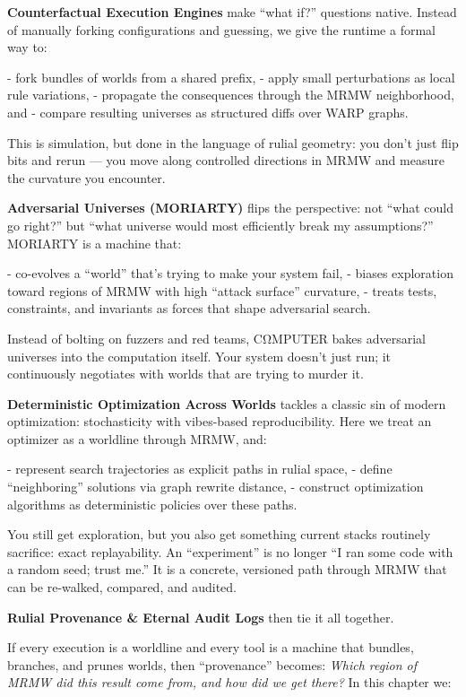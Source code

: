 \textbf{Counterfactual Execution Engines} make “what if?” questions native. Instead of manually forking configurations and guessing, we give the runtime a formal way to:

- fork bundles of worlds from a shared prefix,
- apply small perturbations as local rule variations,
- propagate the consequences through the MRMW neighborhood, and
- compare resulting universes as structured diffs over WARP graphs.

This is simulation, but done in the language of rulial geometry: you don’t just flip bits and rerun — you move along controlled directions in MRMW and measure the curvature you encounter.

\textbf{Adversarial Universes (MORIARTY)} flips the perspective: not “what could go right?” but “what universe would most efficiently break my assumptions?” MORIARTY is a machine that:

- co-evolves a “world” that’s trying to make your system fail,
- biases exploration toward regions of MRMW with high “attack surface” curvature,
- treats tests, constraints, and invariants as forces that shape adversarial search.

Instead of bolting on fuzzers and red teams, CΩMPUTER bakes adversarial universes into the computation itself. Your system doesn’t just run; it continuously negotiates with worlds that are trying to murder it.

\textbf{Deterministic Optimization Across Worlds} tackles a classic sin of modern optimization: stochasticity with vibes-based reproducibility. Here we treat an optimizer as a worldline through MRMW, and:

- represent search trajectories as explicit paths in rulial space,
- define “neighboring” solutions via graph rewrite distance,
- construct optimization algorithms as deterministic policies over these paths.

You still get exploration, but you also get something current stacks routinely sacrifice: exact replayability. An “experiment” is no longer “I ran some code with a random seed; trust me.” It is a concrete, versioned path through MRMW that can be re-walked, compared, and audited.

\textbf{Rulial Provenance \& Eternal Audit Logs} then tie it all together.

If every execution is a worldline and every tool is a machine that bundles, branches, and prunes worlds, then “provenance” becomes: \emph{Which region of MRMW did this result come from, and how did we get there?} In this chapter we:


